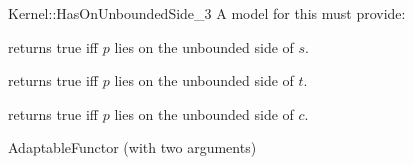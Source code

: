 \begin{ccRefFunctionObjectConcept}{Kernel::HasOnUnboundedSide_3}
A model for this must provide:


{returns true iff $p$ lies on the unbounded side of $s$.}

{returns true iff $p$ lies on the unbounded side of $t$.}

{returns true iff $p$ lies on the unbounded side of $c$.}

\ccRefines
AdaptableFunctor (with two arguments)

\ccSeeAlso
{} \\
 \\
 \\


\end{ccRefFunctionObjectConcept}

